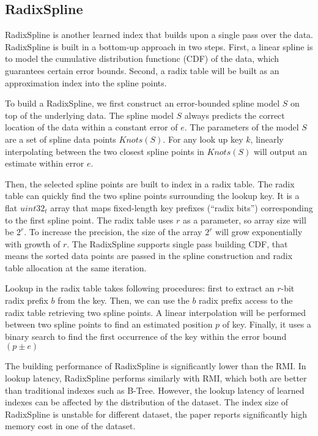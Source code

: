 \subsection{RadixSpline}
RadixSpline \cite{Kipf:2020wr} is another learned index that builds upon a single pass over the data. RadixSpline is built in a bottom-up approach in two steps. First, a linear spline is to model the cumulative distribution functionc (CDF) of the data, which guarantees certain error bounds. Second, a radix table will be built as an approximation index into the spline points. 

To build a RadixSpline, we first construct an error-bounded spline model $S$ on top of the underlying data. The spline model $S$ always predicts the correct location of the data within a constant error of $e$. The parameters of the model $S$ are a set of spline data points $Knots(S)$. For any look up key $k$, linearly interpolating between the two closest spline points in $Knots(S)$ will output an estimate within error $e$. 

Then, the selected spline points are built to index in a radix table. The radix table can quickly find the two spline points surrounding the lookup key. It is a flat $uint32_t$ array that maps fixed-length key prefixes (“radix bits”) corresponding to the first spline point. The radix table uses $r$ as a parameter, so array size will be ${2^r}$. To increase the precision, the size of the array ${2^r}$ will grow exponentially with growth of $r$. The RadixSpline supports single pass building CDF, that means the sorted data points are passed in the spline construction and radix table allocation at the same iteration. 

Lookup in the radix table takes following procedures: first to extract an $r$-bit radix prefix $b$ from the key. Then, we can use the $b$ radix prefix access to the radix table retrieving two spline points. A linear interpolation will be performed between two spline points to find an estimated position $p$ of key. Finally, it uses a binary search to find the first occurrence of the key within the error bound $(p \pm e)$

The building performance of RadixSpline is significantly lower than the RMI. In lookup latency, RadixSpline performs similarly with RMI, which both are better than traditional indexes such as B-Tree. However, the lookup latency of learned indexes can be affected by the distribution of the dataset. The index size of RadixSpline is unstable for different dataset, the paper reports significantly high memory cost in one of the dataset. 


